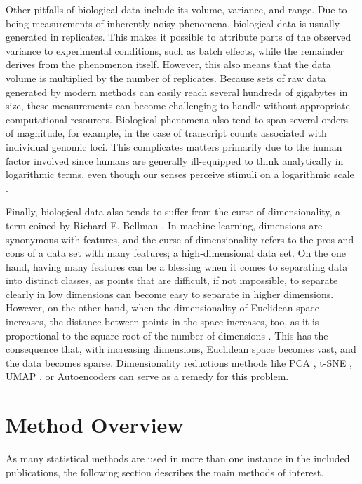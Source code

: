 Other pitfalls of biological data include its volume, variance, and range. Due
to being measurements of inherently noisy phenomena, biological data is usually
generated in replicates. This makes it possible to attribute parts of the
observed variance to experimental conditions, such as batch effects, while the
remainder derives from the phenomenon itself. However, this also means that the
data volume is multiplied by the number of replicates. Because sets of raw
data generated by modern methods can easily reach several hundreds of gigabytes
in size, these measurements can become challenging to handle without
appropriate computational resources. Biological phenomena also tend to span
several orders of magnitude, for example, in the case of transcript counts
associated with individual genomic loci. This complicates matters primarily due
to the human factor involved since humans are generally ill-equipped to think
analytically in logarithmic terms, even though our senses perceive stimuli on a
logarithmic scale \citep{Sun2012a}.

Finally,\label{mar:dimensionality}
biological data also tends to suffer from the curse of dimensionality, a term
coined by  Richard E. Bellman \citep{Bellman1957,Bellman1961}. In machine
learning, dimensions are synonymous with features, and the curse of
dimensionality refers to the pros and cons of a data set with many features; a
high-dimensional data set. On the one hand, having many features can be a
blessing when it comes to separating data into distinct classes, as points that
are difficult, if not impossible, to separate clearly in low dimensions can
become easy to separate in higher dimensions. However, on the other hand, when
the dimensionality of Euclidean space increases, the distance between points in
the space increases, too, as it is proportional to the square root of the
number of dimensions \citep{Tabak2014}. This has the consequence that, with
increasing dimensions, Euclidean space becomes vast, and the data becomes
sparse. Dimensionality reductions methods like PCA \citep{Pearson1901}, t-SNE
\citep{Hinton}, UMAP \citep{McInnes2018}, or Autoencoders \citep{Kramer1991}
can serve as a remedy for this problem.


\section{Method Overview}\label{sec:methoverview}
As many statistical methods are used in more than one instance in the included
publications, the following section describes the main methods of interest.

